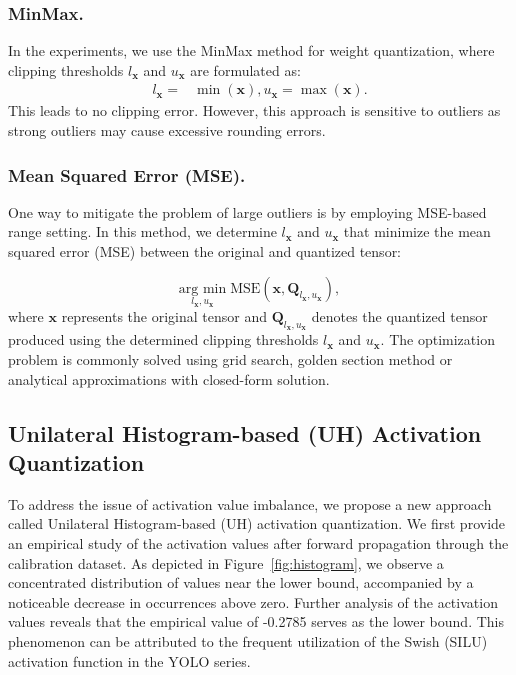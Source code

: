 \documentclass[runningheads]{llncs}
\begin{document}
\subsubsection{MinMax.} In the experiments, we use the MinMax method for weight quantization, where clipping thresholds $l_\mathbf{x}$ and $u_\mathbf{x}$ are formulated as:
\begin{align}
l_\mathbf{x}=&\min(\mathbf{x}), u_\mathbf{x}=\max(\mathbf{x}).
\label{eq:minmax}
\end{align}
%
This leads to no clipping error. However, this approach is sensitive to outliers as strong outliers may cause excessive rounding errors.
\subsubsection{Mean Squared Error (MSE).} One way to mitigate the problem of large outliers is by employing MSE-based range setting. In this method, we determine $l_\mathbf{x}$ and $u_\mathbf{x}$ that minimize the mean squared error (MSE) between the original and quantized tensor:

\begin{equation}
\underset{l_\mathbf{x}, u_\mathbf{x}}{\text{arg min}} \; \text{MSE}(\mathbf{x}, \mathbf{Q}_{l_\mathbf{x}, u_\mathbf{x}}),
\end{equation}
%
where $\mathbf{x}$ represents the original tensor and $\mathbf{Q}_{l_\mathbf{x}, u_\mathbf{x}}$ denotes the quantized tensor produced using the determined clipping thresholds $l_\mathbf{x}$ and $u_\mathbf{x}$. The optimization problem is commonly solved using grid search, golden section method or analytical approximations with closed-form solution.

\subsection{Unilateral Histogram-based (UH) Activation Quantization}
%
To address the issue of activation value imbalance, we propose a new approach called Unilateral Histogram-based (UH) activation quantization. We first provide an empirical study of the activation values after forward propagation through the calibration dataset. As depicted in Figure~\ref{fig:histogram}, we observe a concentrated distribution of values near the lower bound, accompanied by a noticeable decrease in occurrences above zero. Further analysis of the activation values reveals that the empirical value of -0.2785 serves as the lower bound. This phenomenon can be attributed to the frequent utilization of the Swish (SILU) activation function in the YOLO series.
%
\end{document}
